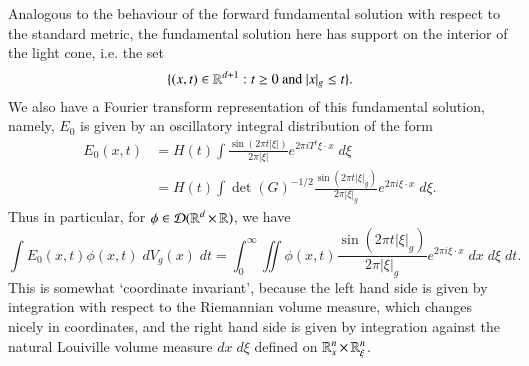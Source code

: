 %
%
%
%
%
%
%
%
%
%
%
%
%
%
%
Analogous to the behaviour of the forward fundamental solution with respect to the standard metric, the fundamental solution here has support on the interior of the light cone, i.e. the set
%
\[ \{ (x,t) \in \RR^{d+1}: t \geq 0\ \text{and}\ |x|_g \leq t \}. \]
%
We also have a Fourier transform representation of this fundamental solution, namely, $E_0$ is given by an oscillatory integral distribution of the form
\begin{align*}
    E_0(x,t) &= H(t) \int \frac{\sin(2 \pi t |\xi|)}{2 \pi |\xi|} e^{2 \pi i T^t \xi \cdot x}\; d\xi\\
    &= H(t) \int \det(G)^{-1/2} \frac{\sin(2 \pi t |\xi|_g)}{2 \pi |\xi|_g} e^{2 \pi i \xi \cdot x}\; d\xi.
\end{align*}
%
Thus in particular, for $\phi \in \operatorname{\mathcal{D}}(\operatorname{\mathbb{R}}^d \times \operatorname{\mathbb{R}})$, we have
%
\[ \int E_0(x,t) \phi(x,t)\; dV_g(x)\; dt = \int_0^\infty \iint \phi(x,t) \frac{\sin(2 \pi t |\xi|_g)}{2 \pi |\xi|_g} e^{2 \pi i \xi \cdot x}\; dx\; d\xi\; dt. \]
%
This is somewhat `coordinate invariant', because the left hand side is given by integration with respect to the Riemannian volume measure, which changes nicely in coordinates, and the right hand side is given by integration against the natural Louiville volume measure $dx\; d\xi$ defined on $\operatorname{\mathbb{R}}^n_x \times \operatorname{\mathbb{R}}^n_\xi$.

